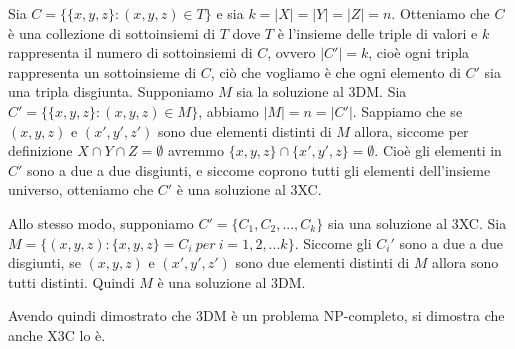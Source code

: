 Sia $C = \{\{x,y,z\}: (x,y,z) \in T\}$ e sia $k = |X| =|Y|=|Z|=n$. 
Otteniamo che $C$ è una collezione di sottoinsiemi di $T$ dove $T$ è l'insieme delle triple di valori e $k$ rappresenta il numero di sottoinsiemi di $C$, ovvero $|C'|=k$, cioè ogni tripla rappresenta un sottoinsieme di $C$, ciò che vogliamo è che ogni elemento di $C'$ sia una tripla disgiunta. 
Supponiamo $M$ sia la soluzione al 3DM. 
Sia $C' = \{\{x,y,z\}: (x,y,z)\in M\}$, abbiamo $|M|=n=|C'|$. 
Sappiamo che se $(x,y,z)$ e $(x',y',z')$ sono due elementi distinti di $M$ allora, siccome per definizione $X\cap Y \cap Z = \emptyset$ avremmo $\{x,y,z\} \cap \{x',y',z\} = \emptyset$. 
Cioè gli elementi in $C'$ sono a due a due disgiunti, e siccome coprono tutti gli elementi dell'insieme universo, otteniamo che $C'$ è una soluzione al 3XC. 

Allo stesso modo, supponiamo $C'=\{C_1,C_2,...,C_k\}$ sia una soluzione al 3XC.
Sia $M=\{(x,y,z): \{x,y,z\} = C_i \ per \ i = 1,2,...k \}$.
Siccome gli $C_i'$ sono a due a due disgiunti, se $(x,y,z)$ e $(x',y',z')$ sono due elementi distinti di $M$ allora sono tutti distinti. 
Quindi $M$ è una soluzione al 3DM. 

Avendo quindi dimostrato che 3DM è un problema NP-completo, si dimostra che anche X3C lo è. 

